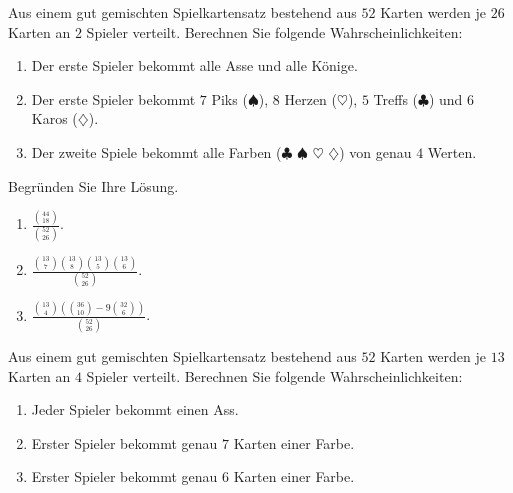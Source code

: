  Aus einem gut gemischten Spielkartensatz
bestehend aus $52$ Karten werden je $26$ Karten an $2$ Spieler verteilt. Berechnen
Sie folgende Wahrscheinlichkeiten:
\begin{enumerate}
    \item Der erste Spieler bekommt alle Asse und alle Könige. 
    \item Der erste Spieler bekommt $7$ Piks ($\spadesuit$), $8$ Herzen
        ($\heartsuit$), $5$ Treffs ($\clubsuit$) und $6$ Karos
        ($\diamondsuit$).
    \item Der zweite Spiele bekommt alle Farben ($\clubsuit$ $\spadesuit$
        $\heartsuit$ $\diamondsuit$) von genau $4$ Werten. 
\end{enumerate}
Begründen Sie Ihre Lösung.

\solution
\begin{enumerate}
    \item $\frac{ \binom{44}{18}  }{ \binom{52}{26} }$.
    \item $\frac{ \binom{13}{7} \binom{13}{8} \binom{13}{5} \binom{13}{6}  }{ \binom{52}{26} }$.
    \item $\frac{\binom{13}{4} \left( \binom{36}{10} - 9 \binom{32}{6} \right)   }{ \binom{52}{26} }$.
\end{enumerate}

 Aus einem gut gemischten Spielkartensatz
bestehend aus $52$ Karten werden je $13$ Karten an $4$ Spieler verteilt.
Berechnen Sie folgende Wahrscheinlichkeiten:
\begin{enumerate}
    \item Jeder Spieler bekommt einen Ass. 
    \item Erster Spieler bekommt genau $7$ Karten einer Farbe.
    \item Erster Spieler bekommt genau $6$ Karten einer Farbe.
\end{enumerate}

